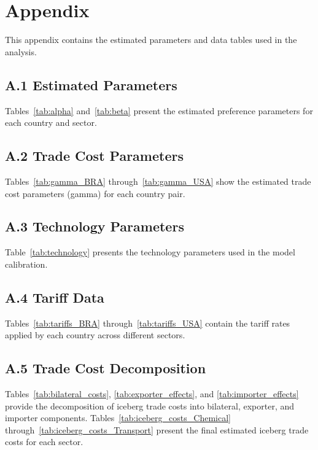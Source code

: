 \section*{Appendix}

This appendix contains the estimated parameters and data tables used in the analysis.

\subsection*{A.1 Estimated Parameters}
Tables~\ref{tab:alpha} and~\ref{tab:beta} present the estimated preference parameters for each country and sector.

\subsection*{A.2 Trade Cost Parameters}
Tables~\ref{tab:gamma_BRA} through~\ref{tab:gamma_USA} show the estimated trade cost parameters (gamma) for each country pair.

\subsection*{A.3 Technology Parameters}
Table~\ref{tab:technology} presents the technology parameters used in the model calibration.

\subsection*{A.4 Tariff Data}
Tables~\ref{tab:tariffs_BRA} through~\ref{tab:tariffs_USA} contain the tariff rates applied by each country across different sectors.

\subsection*{A.5 Trade Cost Decomposition}
Tables~\ref{tab:bilateral_costs}, \ref{tab:exporter_effects}, and \ref{tab:importer_effects} provide the decomposition of iceberg trade costs into bilateral, exporter, and importer components. Tables~\ref{tab:iceberg_costs_Chemical} through~\ref{tab:iceberg_costs_Transport} present the final estimated iceberg trade costs for each sector.

\begin{landscape}


\end{landscape}

